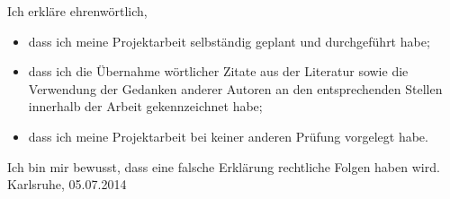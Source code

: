 \documentclass{article}
\begin{document}
Ich erkläre ehrenwörtlich,
\begin{itemize}
    \item dass ich meine Projektarbeit selbständig geplant und durchgeführt habe;
    \item dass ich die Übernahme wörtlicher Zitate aus der Literatur sowie die Verwendung der Gedanken anderer Autoren an den entsprechenden Stellen innerhalb der Arbeit gekennzeichnet habe;
    \item dass ich meine Projektarbeit bei keiner anderen Prüfung
    vorgelegt habe.
\end{itemize}
Ich bin mir bewusst, dass eine falsche Erklärung rechtliche Folgen haben wird. \\

\vspace{1cm}
Karlsruhe, 05.07.2014 
\end{document}
